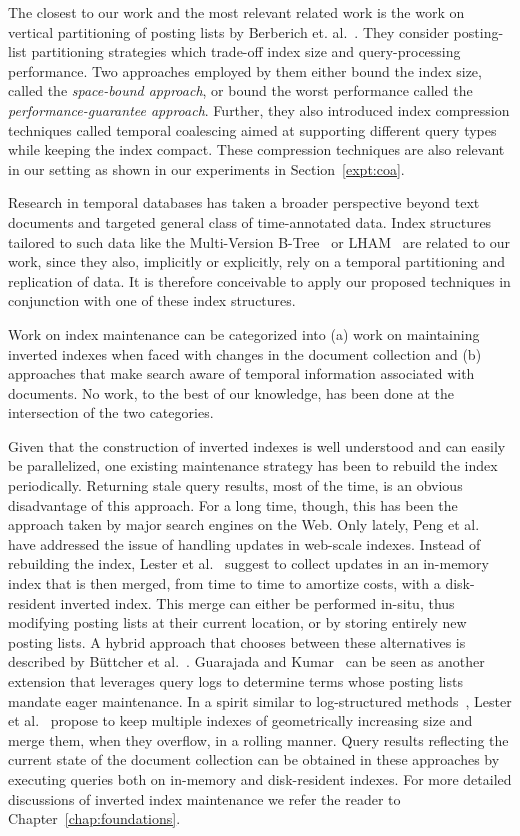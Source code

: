 The closest to our work and the most relevant related work is the work on vertical partitioning of posting lists by Berberich et. al.~\cite{kberberi:sigir2007}. They consider posting-list partitioning strategies which trade-off index size and query-processing performance. Two approaches employed by them either bound the index size, called the \emph{space-bound approach}, or bound the worst performance called the \emph{performance-guarantee approach}. Further, they also introduced index compression techniques called temporal coalescing aimed at supporting different query types while keeping the index compact. These compression techniques are also relevant in our setting as shown in our experiments in Section~\ref{expt:coa}.
 
Research in temporal databases has taken a broader perspective beyond
text documents and targeted general class of time-annotated data. 
Index structures tailored to such data like the
Multi-Version B-Tree~\cite{becker1996asymptotically} or LHAM~\cite{Muth2000} are
related to our work, since they also, implicitly or explicitly, rely
on a temporal partitioning and replication of data. It is therefore
conceivable to apply our proposed techniques in conjunction with one
of these index structures.

Work on index maintenance can be categorized into (a) work on maintaining inverted indexes when faced
with changes in the document collection and (b) approaches that make
search aware of temporal information associated with documents. No
work, to the best of our knowledge, has been done at the intersection
of the two categories.

Given that the construction of inverted indexes is well understood and
can easily be parallelized, one existing maintenance strategy has been
to rebuild the index periodically. Returning stale query results, most
of the time, is an obvious disadvantage of this approach. For a long
time, though, this has been the approach taken by major search engines
on the Web. Only lately, Peng et al.~\cite{Peng:2010fk} have addressed
the issue of handling updates in web-scale indexes. Instead of
rebuilding the index, Lester et al.~\cite{lester2006efficient} suggest to
collect updates in an in-memory index that is then merged, from time
to time to amortize costs, with a disk-resident inverted index. This
merge can either be performed in-situ, thus modifying posting lists at
their current location, or by storing entirely new posting lists. A
hybrid approach that chooses between these alternatives is described
by B\"uttcher et al.~\cite{Buttcher:2008fk}. Guarajada and
Kumar~\cite{Gurajada:2009vn} can be seen as another extension that
leverages query logs to determine terms whose posting lists mandate
eager maintenance. In a spirit similar to log-structured
methods~\cite{ONeil:1996fk}, Lester et al.~\cite{Lester:2008qf}
propose to keep multiple indexes of geometrically increasing size and
merge them, when they overflow, in a rolling manner. Query results
reflecting the current state of the document collection can be
obtained in these approaches by executing queries both on in-memory
and disk-resident indexes. For more detailed discussions of inverted
index maintenance we refer the reader to Chapter~\ref{chap:foundations}.


